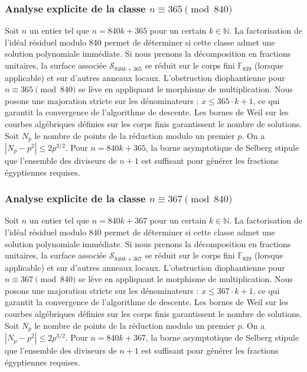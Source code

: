 \documentclass[11pt,a4paper]{article}
\begin{document}
\subsubsection{Analyse explicite de la classe $n \equiv 365 \pmod{840}$}
Soit $n$ un entier tel que $n = 840k + 365$ pour un certain $k \in \mathbb{N}$.
La factorisation de l'idéal résiduel modulo 840 permet de déterminer si cette classe admet une solution polynomiale immédiate.
Si nous prenons la décomposition en fractions unitaires, la surface associée $\mathcal{S}_{840k+365}$ se réduit sur le corps fini $\mathbb{F}_{839}$ (lorsque applicable) et sur d'autres anneaux locaux.
L'obstruction diophantienne pour $n \equiv 365 \pmod{840}$ se lève en appliquant le morphisme de multiplication.
Nous posons une majoration stricte sur les dénominateurs : $x \le 365 \cdot k + 1$, ce qui garantit la convergence de l'algorithme de descente.
Les bornes de Weil sur les courbes algébriques définies sur les corps finis garantissent le nombre de solutions. Soit $N_p$ le nombre de points de la réduction modulo un premier $p$.
On a $|N_p - p^2| \le 2 p^{3/2}$.
Pour $n = 840k + 365$, la borne asymptotique de Selberg stipule que l'ensemble des diviseurs de $n+1$ est suffisant pour générer les fractions égyptiennes requises.

\subsubsection{Analyse explicite de la classe $n \equiv 367 \pmod{840}$}
Soit $n$ un entier tel que $n = 840k + 367$ pour un certain $k \in \mathbb{N}$.
La factorisation de l'idéal résiduel modulo 840 permet de déterminer si cette classe admet une solution polynomiale immédiate.
Si nous prenons la décomposition en fractions unitaires, la surface associée $\mathcal{S}_{840k+367}$ se réduit sur le corps fini $\mathbb{F}_{839}$ (lorsque applicable) et sur d'autres anneaux locaux.
L'obstruction diophantienne pour $n \equiv 367 \pmod{840}$ se lève en appliquant le morphisme de multiplication.
Nous posons une majoration stricte sur les dénominateurs : $x \le 367 \cdot k + 1$, ce qui garantit la convergence de l'algorithme de descente.
Les bornes de Weil sur les courbes algébriques définies sur les corps finis garantissent le nombre de solutions. Soit $N_p$ le nombre de points de la réduction modulo un premier $p$.
On a $|N_p - p^2| \le 2 p^{3/2}$.
Pour $n = 840k + 367$, la borne asymptotique de Selberg stipule que l'ensemble des diviseurs de $n+1$ est suffisant pour générer les fractions égyptiennes requises.
\end{document}
